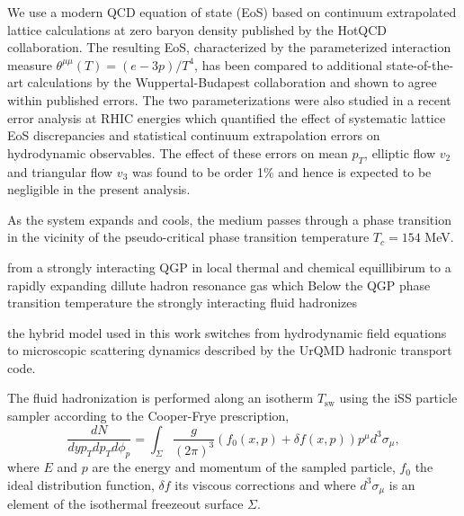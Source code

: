 \documentclass[aps,prc,reprint,amsmath]{revtex4-1}
\begin{document}
We use a modern QCD equation of state (EoS) based on continuum extrapolated lattice calculations at zero baryon density published by the HotQCD collaboration. The resulting EoS, characterized by the parameterized interaction measure $\theta^{\mu\mu}(T) = (e - 3p)/T^4$, has been compared to additional state-of-the-art calculations by the Wuppertal-Budapest collaboration and shown to agree within published errors. The two parameterizations were also studied in a recent error analysis at RHIC energies which quantified the effect of systematic lattice EoS discrepancies and statistical continuum extrapolation errors on hydrodynamic observables. The effect of these errors on mean $p_T$, elliptic flow $v_2$ and triangular flow $v_3$ was found to be order 1\% and hence is expected to be negligible in the present analysis.

As the system expands and cools, the medium passes through a phase transition in the vicinity of the pseudo-critical phase transition temperature $T_c = 154$ MeV.

from a strongly interacting QGP in local thermal and chemical equillibirum to a rapidly expanding dillute hadron resonance gas which 
Below the QGP phase transition temperature the strongly interacting fluid hadronizes 

the hybrid model used in this work switches from hydrodynamic field equations to microscopic scattering dynamics described by the UrQMD hadronic transport code.

The fluid hadronization is performed along an isotherm $T_\text{sw}$ using the iSS particle sampler according to the Cooper-Frye prescription,
\begin{equation}
    \frac{dN}{dy p_T dp_T d\phi_p} = \int_\Sigma \frac{g}{(2\pi)^3} (f_0(x,p) + \delta f(x,p)) p^\mu d^3 \sigma_\mu,
\end{equation}
where $E$ and $p$ are the energy and momentum of the sampled particle, $f_0$ the ideal distribution function, $\delta f$ its viscous corrections and where $d^3\sigma_\mu$ is an element of the isothermal freezeout surface $\Sigma$.
\end{document}

